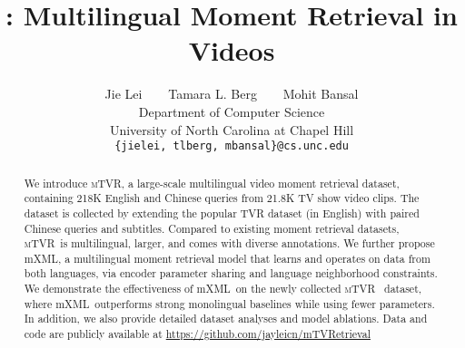 \documentclass[11pt,a4paper]{article}
\title{\DsetName: Multilingual Moment Retrieval in Videos}
\author{
  Jie Lei $\;\;\;\;\;$ 
  Tamara L. Berg $\;\;\;\;\;$ Mohit Bansal \\
  Department of Computer Science \\ University of North Carolina at Chapel Hill \\
  {\tt \{jielei, tlberg, mbansal\}@cs.unc.edu} \\
}
\def\DsetName{\textsc{mTVR}}
\def\ModelName{mXML}
\begin{document}
\maketitle
\begin{abstract}
We introduce \DsetName, a large-scale multilingual video moment retrieval dataset, containing 218K English and Chinese queries from 21.8K TV show video clips.
The dataset is collected by extending the popular TVR dataset (in English) with paired Chinese queries and subtitles. 
Compared to existing moment retrieval datasets, \DsetName~is multilingual, larger, and comes with diverse annotations.
We further propose \ModelName, a multilingual moment retrieval model that learns and operates on data from both languages, via encoder parameter sharing and language neighborhood constraints.
We demonstrate the effectiveness of \ModelName~on the newly collected \DsetName~ dataset, where \ModelName~outperforms strong monolingual baselines while using fewer parameters.
In addition, we also provide detailed dataset analyses and model ablations.
Data and code are publicly available at \url{https://github.com/jayleicn/mTVRetrieval}
\end{abstract}










\end{document}
